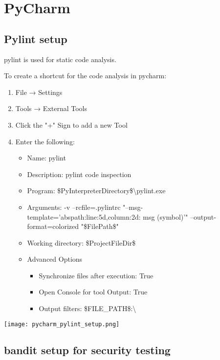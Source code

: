 \section{PyCharm}

\subsection{Pylint setup}

pylint is used for static code analysis.

To create a shortcut for the code analysis in pycharm:

\begin{enumerate}
    \item File → Settings
    \item Tools → External Tools
    \item Click the "+" Sign to add a new Tool
    \item Enter the following:
    \begin{itemize}
        \item Name: pylint
        \item Description: pylint code inspection
        \item Program: \$PyInterpreterDirectory\$\textbackslash pylint.exe
        \item Arguments: -v --rcfile=.pylintrc "--msg-template='{abspath}:{line:5d},{column:2d}: {msg} ({symbol})'" --output-format=colorized "\$FilePath\$"
        \item Working directory: \$ProjectFileDir\$
        \item Advanced Options
        \begin{itemize}
            \item Synchronize files after execution: True
            \item Open Console for tool Output: True
            \item Output filters: \$FILE_PATH\$:\textbackslash %
        \end{itemize}
    \end{itemize}
\end{enumerate}

\texttt{[image: pycharm\_pylint\_setup.png]}




\subsection{bandit setup for security testing}

